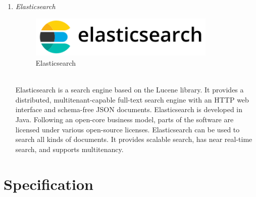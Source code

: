 \documentclass[conference]{IEEEtran}
\begin{document}
\begin{enumerate}
      \item \textit{Elasticsearch }
                      \begin{figure}[htbp]
	\centerline{\includegraphics[width=89mm, scale=0.5]{fig/elasticsearch.png}}
	\caption{Elasticsearch}
	\label{fig}
	\end{figure}
   \\Elasticsearch is a search engine based on the Lucene library. It provides a distributed, multitenant-capable full-text search engine with an HTTP web interface and schema-free JSON documents. Elasticsearch is developed in Java. Following an open-core business model, parts of the software are licensed under various open-source licenses. Elasticsearch can be used to search all kinds of documents. It provides scalable search, has near real-time search, and supports multitenancy.\\

\end{enumerate}


\section{Specification}
\end{document}
